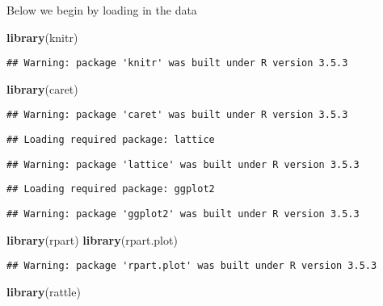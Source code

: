\documentclass[]{article}
\newenvironment{Shaded}{\begin{snugshade}}{\end{snugshade}}
\newcommand{\KeywordTok}[1]{\textcolor[rgb]{0.13,0.29,0.53}{\textbf{#1}}}
\newcommand{\NormalTok}[1]{#1}
\begin{document}
Below we begin by loading in the data

\begin{Shaded}
\begin{Highlighting}[]
\KeywordTok{library}\NormalTok{(knitr)}
\end{Highlighting}
\end{Shaded}

\begin{verbatim}
## Warning: package 'knitr' was built under R version 3.5.3
\end{verbatim}

\begin{Shaded}
\begin{Highlighting}[]
\KeywordTok{library}\NormalTok{(caret)}
\end{Highlighting}
\end{Shaded}

\begin{verbatim}
## Warning: package 'caret' was built under R version 3.5.3
\end{verbatim}

\begin{verbatim}
## Loading required package: lattice
\end{verbatim}

\begin{verbatim}
## Warning: package 'lattice' was built under R version 3.5.3
\end{verbatim}

\begin{verbatim}
## Loading required package: ggplot2
\end{verbatim}

\begin{verbatim}
## Warning: package 'ggplot2' was built under R version 3.5.3
\end{verbatim}

\begin{Shaded}
\begin{Highlighting}[]
\KeywordTok{library}\NormalTok{(rpart)}
\KeywordTok{library}\NormalTok{(rpart.plot)}
\end{Highlighting}
\end{Shaded}

\begin{verbatim}
## Warning: package 'rpart.plot' was built under R version 3.5.3
\end{verbatim}

\begin{Shaded}
\begin{Highlighting}[]
\KeywordTok{library}\NormalTok{(rattle)}
\end{Highlighting}
\end{Shaded}
\end{document}
